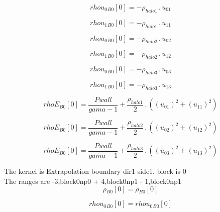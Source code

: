 \documentclass{article}
\begin{document}
\begin{dmath}{rhou_{0}{_{B0}}}[{0}] = - \rho_{halo 1} \,.\, u_{01}\end{dmath}

\begin{dmath}{rhou_{1}{_{B0}}}[{0}] = - \rho_{halo 1} \,.\, u_{11}\end{dmath}

\begin{dmath}{rhou_{0}{_{B0}}}[{0}] = - \rho_{halo 2} \,.\, u_{02}\end{dmath}

\begin{dmath}{rhou_{1}{_{B0}}}[{0}] = - \rho_{halo 2} \,.\, u_{12}\end{dmath}

\begin{dmath}{rhou_{0}{_{B0}}}[{0}] = - \rho_{halo 3} \,.\, u_{03}\end{dmath}

\begin{dmath}{rhou_{1}{_{B0}}}[{0}] = - \rho_{halo 3} \,.\, u_{13}\end{dmath}

\begin{dmath}{rhoE{_{B0}}}[{0}] = \frac{Pwall}{gama - 1} + \frac{\rho_{halo 1}}{2} \,.\, \left(\left(u_{01} \right)^{2} + \left(u_{11} \right)^{2}\right)\end{dmath}

\begin{dmath}{rhoE{_{B0}}}[{0}] = \frac{Pwall}{gama - 1} + \frac{\rho_{halo 2}}{2} \,.\, \left(\left(u_{02} \right)^{2} + \left(u_{12} \right)^{2}\right)\end{dmath}

\begin{dmath}{rhoE{_{B0}}}[{0}] = \frac{Pwall}{gama - 1} + \frac{\rho_{halo 3}}{2} \,.\, \left(\left(u_{03} \right)^{2} + \left(u_{13} \right)^{2}\right)\end{dmath}

\noindent The kernel is Extrapolation boundary dir1 side1, block is 0\\\noindent The ranges are -3,block0np0 + 4,block0np1 - 1,block0np1\\\begin{dmath}{\rho{_{B0}}}[{0}] = {\rho{_{B0}}}[{0}]\end{dmath}

\begin{dmath}{rhou_{0}{_{B0}}}[{0}] = {rhou_{0}{_{B0}}}[{0}]\end{dmath}
\end{document}
